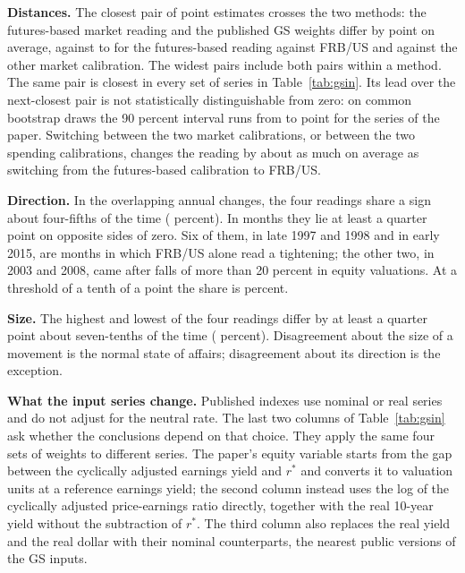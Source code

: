 \documentclass[11pt]{article}
\begin{document}
\textbf{Distances.} The closest pair of point estimates crosses the two methods: the futures-based market reading and the published GS weights differ by  point on average, against  to  for the futures-based reading against FRB/US and against the other market calibration. The widest pairs include both pairs within a method. The same pair is closest in every set of series in Table~\ref{tab:gsin}. Its lead over the next-closest pair is not statistically distinguishable from zero: on common bootstrap draws the 90 percent interval runs from  to  point for the series of the paper. Switching between the two market calibrations, or between the two spending calibrations, changes the reading by about as much on average as switching from the futures-based calibration to FRB/US.

\textbf{Direction.} In the  overlapping annual changes, the four readings share a sign about four-fifths of the time ( percent). In  months they lie at least a quarter point on opposite sides of zero. Six of them, in late 1997 and 1998 and in early 2015, are months in which FRB/US alone read a tightening; the other two, in 2003 and 2008, came after falls of more than 20 percent in equity valuations. At a threshold of a tenth of a point the share is  percent.

\textbf{Size.} The highest and lowest of the four readings differ by at least a quarter point about seven-tenths of the time ( percent). Disagreement about the size of a movement is the normal state of affairs; disagreement about its direction is the exception.

\textbf{What the input series change.} Published indexes use nominal or real series and do not adjust for the neutral rate. The last two columns of Table~\ref{tab:gsin} ask whether the conclusions depend on that choice. They apply the same four sets of weights to different series. The paper's equity variable starts from the gap between the cyclically adjusted earnings yield and $r^*$ and converts it to valuation units at a reference earnings yield; the second column instead uses the log of the cyclically adjusted price-earnings ratio directly, together with the real 10-year yield without the subtraction of $r^*$. The third column also replaces the real yield and the real dollar with their nominal counterparts, the nearest public versions of the GS inputs.
\end{document}
